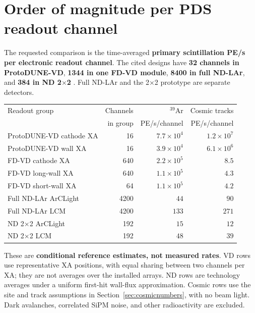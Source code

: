 \section{Order of magnitude per PDS readout channel}
\label{sec:perchannel}

The requested comparison is the time-averaged \textbf{primary scintillation
PE/s per electronic readout channel}. The cited designs have
\textbf{32 channels in ProtoDUNE-VD}, \textbf{1344 in one FD-VD module},
\textbf{8400 in full ND-LAr}, and \textbf{384 in ND 2$\times$2}
\cite{pd_channels,vd_tdr,nd_cdr,nd_channels,nd_operation}.
Full ND-LAr and the 2$\times$2 prototype are separate detectors.

\begin{center}
\small
\begin{tabular}{lrrr}
\toprule
Readout group & Channels & $^{39}$Ar & Cosmic tracks \\
 & in group & PE/s/channel & PE/s/channel \\
\midrule
ProtoDUNE-VD cathode XA & 16 & $7.7\times10^4$ & $1.2\times10^7$ \\
ProtoDUNE-VD wall XA & 16 & $3.9\times10^4$ & $6.1\times10^6$ \\
\addlinespace
FD-VD cathode XA & 640 & $2.2\times10^5$ & $8.5$ \\
FD-VD long-wall XA & 640 & $1.1\times10^5$ & $4.3$ \\
FD-VD short-wall XA & 64 & $1.1\times10^5$ & $4.2$ \\
\addlinespace
Full ND-LAr ArCLight & 4200 & $44$ & $90$ \\
Full ND-LAr LCM & 4200 & $133$ & $271$ \\
\addlinespace
ND 2$\times$2 ArCLight & 192 & $15$ & $12$ \\
ND 2$\times$2 LCM & 192 & $48$ & $39$ \\
\bottomrule
\end{tabular}
\end{center}
These are \textbf{conditional reference estimates, not measured rates}.
VD rows use representative XA positions, with equal sharing between two
channels per XA; they are not averages over the installed arrays. ND rows
are technology averages under a uniform first-hit wall-flux approximation.
Cosmic rows use the site and track assumptions in Section~\ref{sec:cosmicnumbers},
with no beam light. Dark avalanches, correlated SiPM noise, and other
radioactivity are excluded.


